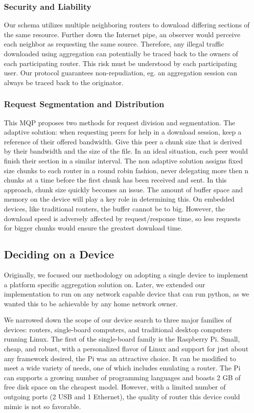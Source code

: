 \documentclass[12pt]{article}
\begin{document}
		\subsubsection{Security and Liability}

			Our schema utilizes multiple neighboring routers to download differing sections of the same resource. Further down the Internet pipe, an observer would perceive each neighbor as requesting the same source. Therefore, any illegal traffic downloaded using aggregation can potentially be traced back to the owners of each participating router. This risk must be understood by each participating user. Our protocol guarantees non-repudiation, eg. an aggregation session can always be traced back to the originator.

		\subsubsection{Request Segmentation and Distribution}

			This MQP proposes two methods for request division and segmentation. The adaptive solution: when requesting peers for help in a download session, keep a reference of their offered bandwidth. Give this peer a chunk size that is derived by their bandwidth and the size of the file. In an ideal situation, each peer would finish their section in a similar interval. The non adaptive solution assigns fixed size chunks to each router in a round robin fashion, never delegating more then n chunks at a time before the first chunk has been received and sent. In this approach, chunk size quickly becomes an issue. The amount of buffer space and memory on the device will play a key role in determining this. On embedded devices, like traditional routers, the buffer cannot be to big. However, the download speed is adversely affected by request/response time, so less requests for bigger chunks would ensure the greatest download time.


	\subsection{Deciding on a Device}
		
		Originally, we focused our methodology on adopting a single device to implement a platform specific aggregation solution on. Later, we extended our implementation to run on any network capable device that can run python, as we wanted this to be achievable by any home network owner.

		We narrowed down the scope of our device search to three major families of devices: routers, single-board computers, and traditional desktop computers running  Linux. The first of the single-board family is the Raspberry Pi. Small, cheap, and robust, with a personalized flavor of Linux and support for just about any framework desired, the Pi was an attractive choice. It can be modified to meet a wide variety of needs, one of which includes emulating a router. The Pi can supports a growing number of programming languages and boasts 2 GB of free disk space on the cheapest model. However, with a limited number of outgoing ports (2 USB and 1 Ethernet), the quality of router this device could mimic is not so favorable.
\end{document}
